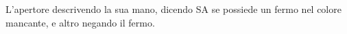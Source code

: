 \documentclass[a4paper,10pt]{article}
\renewcommand{\c}{$\clubsuit$\xspace}
\renewcommand{\d}{$\diamondsuit$\xspace}
\newcommand{\h}{$\heartsuit$\xspace}
\newcommand{\s}{$\spadesuit$\xspace}
\renewcommand{\j}{$\bigstar$\xspace}
\newcommand{\sa}{SA\xspace}
\newcommand{\M}{\mbox{\raisebox{-1.2pt}{$^\heartsuit\mkern-6mu$} \raisebox{1.2pt}{$\mkern-6mu_\spadesuit$}\xspace}}%
\newcommand{\smallspace}{\vskip0.3cm}
\renewcommand{\tabcolsep}{0.3cm}
\theoremstyle{definition}
\newenvironment{twocol}
{\smallspace\noindent\tabularx{\linewidth}{ l X }}%
{\endtabularx\smallspace}
\newcommand{\biddingtable}[2][0.4cm]{
	\needspace{1cm}
	\marginnote{
		\scriptsize{
			\def\arraystretch{1.5}
			\renewcommand{\tabcolsep}{0.1cm}
			\begin{tabular}{|>{\centering\arraybackslash}p{0.6cm}>{\centering\arraybackslash}p{0.6cm}>{\centering\arraybackslash}p{0.6cm}>{\centering\arraybackslash}p{0.6cm}|}
				\hline
				#2
			\end{tabular}
		}
	}[#1]
}
\begin{document}
L'apertore descrivendo la sua mano, dicendo \sa se possiede un fermo nel colore mancante, e altro negando il fermo.


%
%
%
%
%
%
%
%
%
\end{document}
